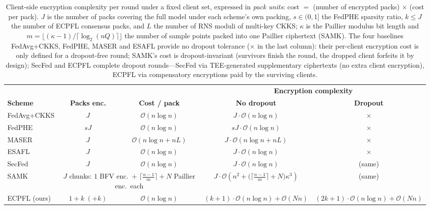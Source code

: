 \begin{table}[t]
\centering
\caption{Client-side encryption complexity per round under a fixed client
set, expressed in \emph{pack units}: cost $=$ (number of encrypted packs)
$\times$ (cost per pack). $J$ is the number of packs covering the full
model under each scheme's own packing, $s\in(0,1]$ the FedPHE sparsity
ratio, $k\le J$ the number of ECPFL consensus packs, and $L$ the number of
RNS moduli of multi-key CKKS; $\kappa$ is the Paillier modulus bit length
and $m=\big\lfloor(\kappa-1)/\lceil\log_2(nQ)\rceil\big\rfloor$ the number
of sample points packed into one Paillier ciphertext (SAMK). The four
baselines FedAvg+CKKS, FedPHE, MASER and ESAFL provide no dropout
tolerance ($\times$ in the last column): their per-client encryption cost
is only defined for a dropout-free round; SAMK's cost is dropout-invariant
(survivors finish the round, the dropped client forfeits it by design);
SecFed and ECPFL complete dropout rounds---SecFed via TEE-generated
supplementary ciphertexts (no extra client encryption), ECPFL via
compensatory encryptions paid by the surviving clients.}
\label{tab:encryption-complexity}
\small
\renewcommand{\arraystretch}{1.22}
\begin{tabular}{@{}lcccc@{}}
\toprule
& & & \multicolumn{2}{c}{\textbf{Encryption complexity}} \\
\cmidrule(lr){4-5}
\textbf{Scheme} & \textbf{Packs enc.} & \textbf{Cost / pack} &
\textbf{No dropout} & \textbf{Dropout} \\
\midrule
FedAvg+CKKS  & $J$    & $\mathcal{O}(n\log n)$    &
$J\cdot\mathcal{O}(n\log n)$ & $\times$ \\[3pt]
FedPHE       & $sJ$   & $\mathcal{O}(n\log n)$    &
$sJ\cdot\mathcal{O}(n\log n)$ & $\times$ \\[3pt]
MASER        & $J$    & $\mathcal{O}(n\log n+nL)$ &
$J\cdot\mathcal{O}(n\log n+nL)$ & $\times$ \\[3pt]
ESAFL        & $J$    & $\mathcal{O}(n\log n)$    &
$J\cdot\mathcal{O}(n\log n)$ & $\times$ \\[3pt]
SecFed       & $J$    & $\mathcal{O}(n\log n)$    &
$J\cdot\mathcal{O}(n\log n)$ & (same) \\[3pt]
SAMK         & \multicolumn{2}{c}{$J$ chunks:
$1$ BFV enc.\ $+$ $\lceil\frac{n-1}{m}\rceil{+}N$ Paillier enc.\ each} &
$J\cdot\mathcal{O}\!\left(n^{2}+\big(\lceil\tfrac{n-1}{m}\rceil{+}N\big)\kappa^{3}\right)$
& (same) \\[3pt]
\midrule
ECPFL (ours) & $1+k\;(+k)$ & $\mathcal{O}(n\log n)$ &
$(k{+}1)\cdot\mathcal{O}(n\log n)+\mathcal{O}(Nn)$ &
$(2k{+}1)\cdot\mathcal{O}(n\log n)+\mathcal{O}(Nn)$ \\
\bottomrule
\end{tabular}


\end{table}
